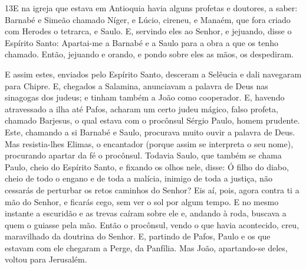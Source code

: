\medskip

\lettrine{13} E na igreja que estava em Antioquia havia alguns
profetas e doutores, a saber: Barnabé e Simeão chamado Níger, e
Lúcio, cireneu, e Manaém, que fora criado com Herodes o tetrarca, e
Saulo. E, servindo eles ao Senhor, e jejuando, disse o Espírito
Santo: Apartai-me a Barnabé e a Saulo para a obra a que os tenho
chamado. Então, jejuando e orando, e pondo sobre eles as mãos,
os despediram.

E assim estes, enviados pelo Espírito Santo, desceram a Selêucia e
dali navegaram para Chipre. E, chegados a Salamina, anunciavam a
palavra de Deus nas sinagogas dos judeus; e tinham também a João
como cooperador. E, havendo atravessado a ilha até Pafos,
acharam um certo judeu mágico, falso profeta, chamado Barjesus,
o qual estava com o procônsul Sérgio Paulo, homem prudente.
Este, chamando a si Barnabé e Saulo, procurava muito ouvir a palavra
de Deus. Mas resistia-lhes Elimas, o encantador (porque assim se
interpreta o seu nome), procurando apartar da fé o procônsul.
Todavia Saulo, que também se chama Paulo, cheio do Espírito
Santo, e fixando os olhos nele, disse: Ó filho do diabo,
cheio de todo o engano e de toda a malícia, inimigo de toda a
justiça, não cessarás de perturbar os retos caminhos do Senhor?
Eis aí, pois, agora contra ti a mão do Senhor, e ficarás
cego, sem ver o sol por algum tempo. E no mesmo instante a escuridão
e as trevas caíram sobre ele e, andando à roda, buscava a quem o
guiasse pela mão. Então o procônsul, vendo o que havia
acontecido, creu, maravilhado da doutrina do Senhor. E,
partindo de Pafos, Paulo e os que estavam com ele chegaram a Perge,
da Panfília. Mas João, apartando-se deles, voltou para Jerusalém.

